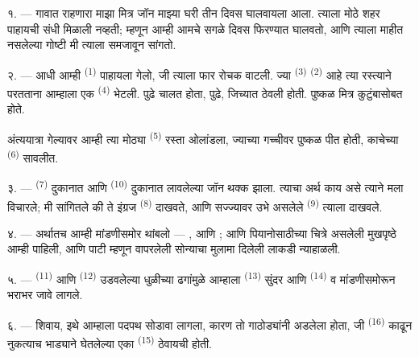 \VUsaut{3.0mm}

१. --- गावात राहणारा माझा मित्र जॉन माझ्या घरी तीन दिवस घालवायला आला.  त्याला
मोठे शहर पाहायची संधी मिळाली नव्हती; म्हणून आम्ही आमचे सगळे दिवस फिरण्यात घालवतो, आणि त्याला
माहीत नसलेल्या गोष्टी मी त्याला समजावून सांगतो.

२. --- आधी आम्ही  \textsuperscript{(1)} पाहायला गेलो, जी त्याला फार रोचक
वाटली. ज्या  \textsuperscript{(3)} 
\textsuperscript{(2)} आहे त्या रस्त्याने परतताना आम्हाला एक 
\textsuperscript{(4)} भेटली.  पुढे  चालत
होता,  पुढे, जिच्यात  ठेवली होती. पुष्कळ मित्र
 कुटुंबासोबत होते.

अंत्ययात्रा गेल्यावर आम्ही त्या मोठ्या  \textsuperscript{(5)} रस्ता
ओलांडला, ज्याच्या गच्चीवर पुष्कळ   पीत होती, काचेच्या
 \textsuperscript{(6)} सावलीत.

३. ---  \textsuperscript{(7)} दुकानात आणि
 \textsuperscript{(10)} दुकानात लावलेल्या  जॉन
थक्क झाला. त्याचा अर्थ काय असे त्याने मला विचारले; मी सांगितले की ते इंग्रज 
\textsuperscript{(8)} दाखवते, आणि सज्ज्यावर उभे असलेले  \textsuperscript{(9)}
त्याला दाखवले.

\VUsaut{3.0mm}

४. --- अर्थातच आम्ही  मांडणीसमोर थांबलो — ,
 आणि ;  आणि पियानोसाठीच्या
 चित्रे असलेली मुखपृष्ठे आम्ही पाहिली, आणि पाटी म्हणून वापरलेली सोन्याचा
मुलामा दिलेली लाकडी  न्याहाळली.

५. ---  \textsuperscript{(11)} आणि 
\textsuperscript{(12)} उडवलेल्या धुळीच्या ढगांमुळे आम्हाला 
\textsuperscript{(13)} सुंदर  आणि 
\textsuperscript{(14)}  व  मांडणीसमोरून भराभर जावे
लागले.

६. --- शिवाय, इथे आम्हाला पदपथ सोडावा लागला, कारण तो गाठोड्यांनी अडलेला होता, जी
 \textsuperscript{(16)} काढून नुकत्याच भाड्याने घेतलेल्या एका
 \textsuperscript{(15)} ठेवायची होती.

